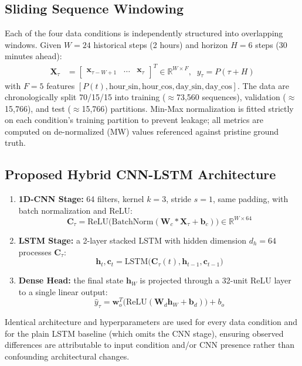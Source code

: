 \documentclass[conference]{IEEEtran}
\begin{document}
\subsection{Sliding Sequence Windowing}
Each of the four data conditions is independently structured into overlapping windows. Given $W=24$ historical steps (2 hours) and horizon $H=6$ steps (30 minutes ahead):
\begin{align}
\mathbf{X}_\tau &= \begin{bmatrix} \mathbf{x}_{\tau-W+1} & \dots & \mathbf{x}_\tau \end{bmatrix}^T \in \mathbb{R}^{W \times F}, \;\;
y_\tau = P(\tau + H)
\end{align}
with $F=5$ features $[P(t), \text{hour\_sin}, \text{hour\_cos}, \text{day\_sin}, \text{day\_cos}]$. The data are chronologically split 70/15/15 into training ($\approx$73{,}560 sequences), validation ($\approx$15{,}766), and test ($\approx$15{,}766) partitions. Min-Max normalization is fitted strictly on each condition's training partition to prevent leakage; all metrics are computed on de-normalized (MW) values referenced against pristine ground truth.

\subsection{Proposed Hybrid CNN-LSTM Architecture}
\begin{enumerate}
    \item \textbf{1D-CNN Stage:} 64 filters, kernel $k=3$, stride $s=1$, same padding, with batch normalization and ReLU:
    \begin{equation}
    \mathbf{C}_\tau = \text{ReLU}\big(\text{BatchNorm}(\mathbf{W}_c * \mathbf{X}_\tau + \mathbf{b}_c)\big) \in \mathbb{R}^{W \times 64}
    \end{equation}
    \item \textbf{LSTM Stage:} a 2-layer stacked LSTM with hidden dimension $d_h=64$ processes $\mathbf{C}_\tau$:
    \begin{equation}
    \mathbf{h}_t, \mathbf{c}_t = \text{LSTM}\big(\mathbf{C}_\tau(t), \mathbf{h}_{t-1}, \mathbf{c}_{t-1}\big)
    \end{equation}
    \item \textbf{Dense Head:} the final state $\mathbf{h}_W$ is projected through a 32-unit ReLU layer to a single linear output:
    \begin{equation}
    \hat{y}_\tau = \mathbf{w}_o^T\big(\text{ReLU}(\mathbf{W}_d \mathbf{h}_W + \mathbf{b}_d)\big) + b_o
    \end{equation}
\end{enumerate}
Identical architecture and hyperparameters are used for every data condition and for the plain LSTM baseline (which omits the CNN stage), ensuring observed differences are attributable to input condition and/or CNN presence rather than confounding architectural changes.
\end{document}
